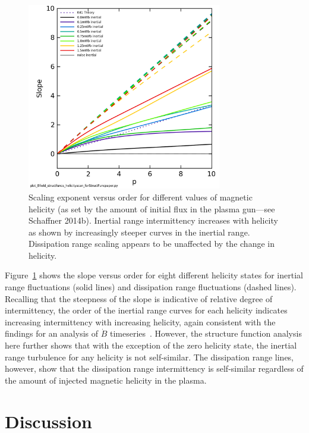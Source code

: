 \documentclass[aps,prl,amsmath,amssymb,reprint,superscriptaddress]{revtex4-1} %
\begin{document}
\begin{figure}[!htbp]
\centerline{
\includegraphics[width=8.5cm]{Bmod_StructureFunctionSlope_vs_Moment_helicityscan.png}}
\caption{\label{fig:helscan} Scaling exponent versus order for different values of magnetic helicity (as set by the amount of initial flux in the plasma gun---see Schaffner 2014b). Inertial range intermittency increases with helicity as shown by increasingly steeper curves in the inertial range. Dissipation range scaling appears to be unaffected by the change in helicity. }
\end{figure}

Figure~\ref{fig:helscan} shows the slope versus order for eight different helicity states for inertial range fluctuations (solid lines) and dissipation range fluctuations (dashed lines). Recalling that the steepness of the slope is indicative of relative degree of intermittency, the order of the inertial range curves for each helicity indicates increasing intermittency with increasing helicity, again consistent with the findings for an analysis of $\dot{B}$ timeseries~\cite{schaffner2014b}. However, the structure function analysis here further shows that with the exception of the zero helicity state, the inertial range turbulence for any helicity is not self-similar. The dissipation range lines, however, show that the dissipation range intermittency is self-similar regardless of the amount of injected magnetic helicity in the plasma.

\section{Discussion}
\end{document}

